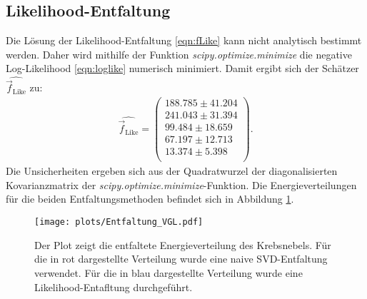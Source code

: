 \subsection{Likelihood-Entfaltung}
Die Lösung der Likelihood-Entfaltung \eqref{eqn:fLike} kann nicht analytisch bestimmt werden. Daher wird mithilfe der Funktion \textit{scipy.optimize.minimize} die negative Log-Likelihood \eqref{eqn:loglike} numerisch minimiert. Damit ergibt sich der Schätzer $\hat{\vec{f}_{\text{Like}}}$ zu:\\
\begin{align*}
	\hat{\vec{f}_{\text{Like}}} = \begin{pmatrix}
			188.785 \pm 41.204\\
			241.043 \pm 31.394\\
			99.484 \pm 18.659\\
			67.197 \pm 12.713\\
			13.374 \pm 5.398\\
	\end{pmatrix}.
\end{align*}
Die Unsicherheiten ergeben sich aus der Quadratwurzel der diagonalisierten Kovarianzmatrix der \textit{scipy.optimize.minimize}-Funktion.
Die Energieverteilungen für die beiden Entfaltungsmethoden befindet sich in Abbildung \ref{fig:E3}.
\begin{figure}
  \centering
  \texttt{[image: plots/Entfaltung\_VGL.pdf]}
  \caption{Der Plot zeigt die entfaltete Energieverteilung des Krebsnebels. Für die in rot dargestellte Verteilung wurde eine naive SVD-Entfaltung verwendet. Für die in blau dargestellte Verteilung wurde eine Likelihood-Entafltung durchgeführt.}
  \label{fig:E3}
\end{figure}

